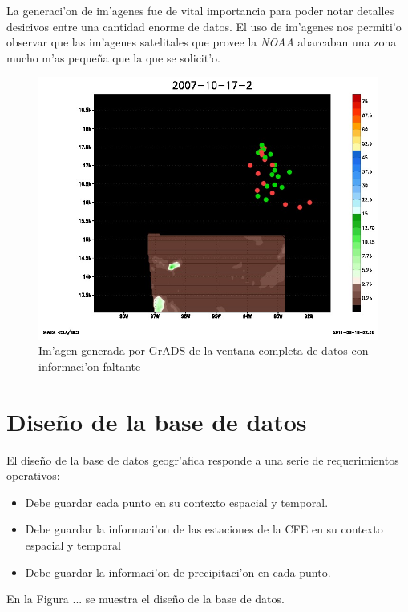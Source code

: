 La generaci'on de im'agenes fue de vital importancia para poder notar detalles desicivos entre una cantidad enorme de datos.
El uso de im'agenes nos permiti'o observar que las im'agenes satelitales que provee la \textit{NOAA} abarcaban una zona mucho
m'as peque\~na que la que se solicit'o.

\begin{figure}[h!]
 \centering
 \includegraphics[width=120mm]{./imagenes/2007_10_17_2.jpg}
 \caption{Im'agen generada por GrADS de la ventana completa de datos con informaci'on faltante}
\end{figure}


\section{Dise\~no de la base de datos}

El dise\~no de la base de datos geogr'afica responde a una serie de requerimientos operativos:
\begin{itemize}
 \item Debe guardar cada punto en su contexto espacial y temporal.
 \item Debe guardar la informaci'on de las estaciones de la CFE en su contexto espacial y temporal
 \item Debe guardar la informaci'on de precipitaci'on en cada punto.
\end{itemize}

En la Figura ... se muestra el diseño de la base de datos.


